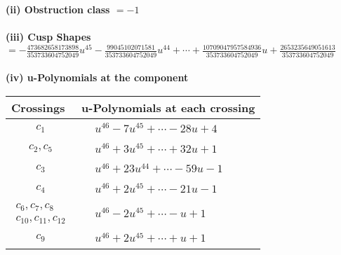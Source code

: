 \documentclass[1p]{elsarticle_modified}
\theoremstyle{definition}
\begin{document}
\flushleft \textbf{(ii) Obstruction class $= -1$}\\~\\
\flushleft \textbf{(iii) Cusp Shapes $= -\frac{473682658173898}{353733604752049} u^{45}-\frac{99045102071581}{353733604752049} u^{44}+\cdots+\frac{10709047957584936}{353733604752049} u+\frac{2653235649051613}{353733604752049}$}\\~\\
\newpage\renewcommand{\arraystretch}{1}
\flushleft \textbf{(iv) u-Polynomials at the component}\newline \\
\begin{tabular}{m{50pt}|m{274pt}}
Crossings & \hspace{64pt}u-Polynomials at each crossing \\
\hline $$\begin{aligned}c_{1}\end{aligned}$$&$\begin{aligned}
&u^{46}-7 u^{45}+\cdots-28 u+4
\end{aligned}$\\
\hline $$\begin{aligned}c_{2},c_{5}\end{aligned}$$&$\begin{aligned}
&u^{46}+3 u^{45}+\cdots+32 u+1
\end{aligned}$\\
\hline $$\begin{aligned}c_{3}\end{aligned}$$&$\begin{aligned}
&u^{46}+23 u^{44}+\cdots-59 u-1
\end{aligned}$\\
\hline $$\begin{aligned}c_{4}\end{aligned}$$&$\begin{aligned}
&u^{46}+2 u^{45}+\cdots-21 u-1
\end{aligned}$\\
\hline $$\begin{aligned}c_{6},c_{7},c_{8}\\c_{10},c_{11},c_{12}\end{aligned}$$&$\begin{aligned}
&u^{46}-2 u^{45}+\cdots- u+1
\end{aligned}$\\
\hline $$\begin{aligned}c_{9}\end{aligned}$$&$\begin{aligned}
&u^{46}+2 u^{45}+\cdots+u+1
\end{aligned}$\\
\hline
\end{tabular}\\~\\
\end{document}
